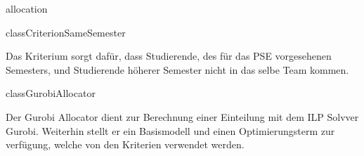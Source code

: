 \begin{texdocpackage}{allocation}
\begin{texdocclass}{class}{CriterionSameSemester}
\label{texdoclet:allocation.CriterionSameSemester}
\begin{texdocclassintro}
Das Kriterium sorgt dafür, dass Studierende, des für das PSE vorgesehenen
Semesters, und Studierende höherer Semester nicht in das selbe Team kommen.\end{texdocclassintro}
\begin{texdocclassconstructors}
\end{texdocclassconstructors}
\begin{texdocclassmethods}
\end{texdocclassmethods}
\end{texdocclass}


\begin{texdocclass}{class}{GurobiAllocator}
\label{texdoclet:allocation.GurobiAllocator}
\begin{texdocclassintro}
Der Gurobi Allocator dient zur Berechnung einer Einteilung mit dem ILP Solvver Gurobi. Weiterhin stellt er ein Basismodell und einen Optimierungsterm zur verfügung, welche von den Kriterien verwendet werden.\end{texdocclassintro}
\begin{texdocclassconstructors}
\end{texdocclassconstructors}
\begin{texdocclassmethods}
\end{texdocclassmethods}
\end{texdocclass}


\end{texdocpackage}



